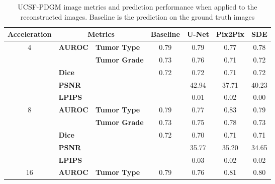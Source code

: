 \begin{table}[]
    \centering
    \caption{UCSF-PDGM image metrics and prediction performance when applied to the reconstructed images. Baseline is the prediction on the ground truth images}\label{tab:ucsf_perf}
    \begin{tabular}{cll|cccc}
    \hline
    \multicolumn{1}{l}{\textbf{Acceleration}} & \multicolumn{2}{c|}{\textbf{Metrics}}         & \textbf{Baseline} & \textbf{U-Net} & \textbf{Pix2Pix} & \textbf{SDE} \\ \hline
    \multirow{5}{*}{4}               & \multirow{2}{*}{\textbf{AUROC}} & \textbf{Tumor Type}  &    0.79      &   0.79   &  0.77   &     0.78     \\
                                     &                        & \textbf{Tumor Grade} &   0.73       &   0.76   &  0.71   &     0.72     \\ \cline{2-3}
                                     & \multicolumn{2}{l|}{\textbf{Dice}}            &  0.72        &   0.72   &  0.71   &     0.72     \\ \cline{2-3}
                                     & \multicolumn{2}{l|}{\textbf{PSNR}}            &     \cellcolor[HTML]{C0C0C0}    &   42.94   &  37.71   &     40.23     \\
                                     & \multicolumn{2}{l|}{\textbf{LPIPS}}           &     \cellcolor[HTML]{C0C0C0}     &   0.01   &  0.02   &     0.00     \\ \hline
    \multirow{5}{*}{8}               & \multirow{2}{*}{\textbf{AUROC}} & \textbf{Tumor Type}  &   0.79       &   0.77   &  0.83   &     0.79     \\
                                     &                        & \textbf{Tumor Grade} &   0.73       &   0.75   &  0.78   &     0.73     \\ \cline{2-3}
                                     & \multicolumn{2}{l|}{\textbf{Dice}}            &  0.72        &   0.70   &  0.71   &     0.71     \\ \cline{2-3}
                                     & \multicolumn{2}{l|}{\textbf{PSNR}}            &   \cellcolor[HTML]{C0C0C0}      &   35.77   &  35.20   &     34.65     \\
                                     & \multicolumn{2}{l|}{\textbf{LPIPS}}           &   \cellcolor[HTML]{C0C0C0}       &   0.03   &  0.02   &     0.02     \\ \hline
    \multirow{5}{*}{16}               & \multirow{2}{*}{\textbf{AUROC}} & \textbf{Tumor Type}  &   0.79       &   0.76   &  0.81   &     0.80     \\

\end{tabular}
\end{table}
